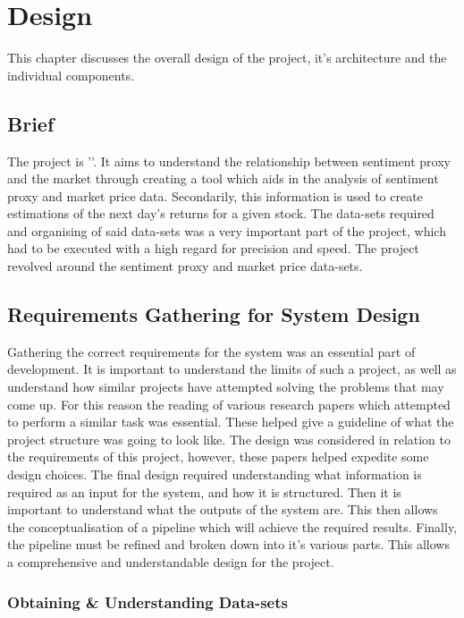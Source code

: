 
\chapter{Design}

This chapter discusses the overall design of the project, it's architecture and the individual components.

\section{Brief}

The project is '\thesistitle'. It aims to understand the relationship between sentiment proxy and the market through creating a tool which aids in the analysis of sentiment proxy and market price data. Secondarily, this information is used to create estimations of the next day's returns for a given stock. The data-sets required and organising of said data-sets was a very important part of the project, which had to be executed with a high regard for precision and speed. The project revolved around the sentiment proxy and market price data-sets.

\section{Requirements Gathering for System Design}

Gathering the correct requirements for the system was an essential part of development. It is important to understand the limits of such a project, as well as understand how similar projects have attempted solving the problems that may come up. For this reason the reading of various research papers which attempted to perform a similar task was essential. These helped give a guideline of what the project structure was going to look like. The design was considered in relation to the requirements of this project, however, these papers helped expedite some design choices. The final design required understanding what information is required as an input for the system, and how it is structured. Then it is important to understand what the outputs of the system are. This then allows the conceptualisation of a pipeline which will achieve the required results. Finally, the pipeline must be refined and broken down into it's various parts. This allows a comprehensive and understandable design for the project.

\subsection{Obtaining \& Understanding Data-sets}

